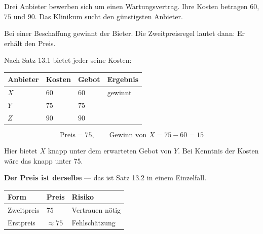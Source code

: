 \begin{aufgabe}
Drei Anbieter bewerben sich um einen Wartungsvertrag. Ihre Kosten betragen $60$, $75$ und $90$. Das Klinikum sucht den günstigsten Anbieter.

\loesung
{}
Bei einer Beschaffung gewinnt der  Bieter. Die Zweitpreisregel lautet dann: Er erhält den  Preis.

Nach Satz 13.1 bietet jeder seine Kosten:
\begin{center}
{\small
\renewcommand{\arraystretch}{1.48}
\begin{tabular}{@{}P{1.8cm}P{1.8cm}P{2.0cm}P{2.0cm}@{}}
\toprule
\textbf{Anbieter} & \textbf{Kosten} & \textbf{Gebot} & \textbf{Ergebnis}\\
\midrule
$X$ & $60$ & $60$ & \textcolor{gruen}{gewinnt}\\
$Y$ & $75$ & $75$ & \\
$Z$ & $90$ & $90$ & \\
\bottomrule
\end{tabular}}
\end{center}

\[ \text{Preis} = 75, \qquad \text{Gewinn von } X = 75-60 = 15 \]

Hier bietet $X$ knapp unter dem erwarteten Gebot von $Y$. Bei Kenntnis der Kosten wäre das knapp unter $75$.

\begin{center}
\begin{minipage}{0.9\textwidth}
\textbf{Der Preis ist derselbe} --- das ist Satz 13.2 in einem Einzelfall.
\end{minipage}
\end{center}

\begin{center}
\begin{minipage}{0.88\textwidth}
\end{minipage}
\end{center}

\begin{center}
{\small
\renewcommand{\arraystretch}{1.5}
\begin{tabular}{@{}P{2.6cm}P{2.0cm}P{2.6cm}@{}}
\toprule
\textbf{Form} & \textbf{Preis} & \textbf{Risiko}\\
\midrule
Zweitpreis & $75$ & Vertrauen nötig\\
Erstpreis & $\approx 75$ & Fehlschätzung\\
\bottomrule
\end{tabular}}
\end{center}


\end{aufgabe}
